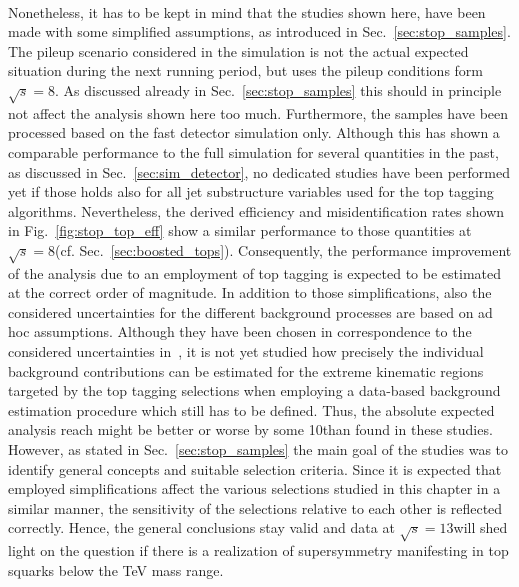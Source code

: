 \\
Nonetheless, it has to be kept in mind that the studies shown here, have been made with some simplified assumptions, as introduced in Sec.~\ref{sec:stop_samples}. The pileup scenario considered in the simulation is not the actual expected situation during the next running period, but uses the pileup conditions form $\sqrt{s} = 8$\tev. As discussed already in Sec.~\ref{sec:stop_samples} this should in principle not affect the analysis shown here too much. Furthermore, the samples have been processed based on the fast detector simulation only. Although this has shown a comparable performance to the full simulation for several quantities in the past, as discussed in Sec.~\ref{sec:sim_detector}, no dedicated studies have been performed yet if those holds also for all jet substructure variables used for the top tagging algorithms. Nevertheless, the derived efficiency and misidentification rates shown in Fig.~\ref{fig:stop_top_eff} show a similar performance to those quantities at $\sqrt{s} = 8$\tev (cf. Sec.~\ref{sec:boosted_tops}). Consequently, the performance improvement of the analysis due to an employment of top tagging is expected to be estimated at the correct order of magnitude. In addition to those simplifications, also the considered uncertainties for the different background processes are based on ad hoc assumptions. Although they have been chosen in correspondence to the considered uncertainties in~\cite{CMS-PAS-SUS-13-015}, it is not yet studied how precisely the individual background contributions can be estimated for the extreme kinematic regions targeted by the top tagging selections when employing a data-based background estimation procedure which still has to be defined. Thus, the absolute expected analysis reach might be better or worse by some 10\gev than found in these studies. However, as stated in Sec.~\ref{sec:stop_samples} the main goal of the studies was to identify general concepts and suitable selection criteria. Since it is expected that employed simplifications affect the various selections studied in this chapter in a similar manner, the sensitivity of the selections relative to each other is reflected correctly. Hence, the general conclusions stay valid and data at $\sqrt{s} = 13$\tev will shed light on the question if there is a realization of supersymmetry manifesting in top squarks below the TeV mass range.   

